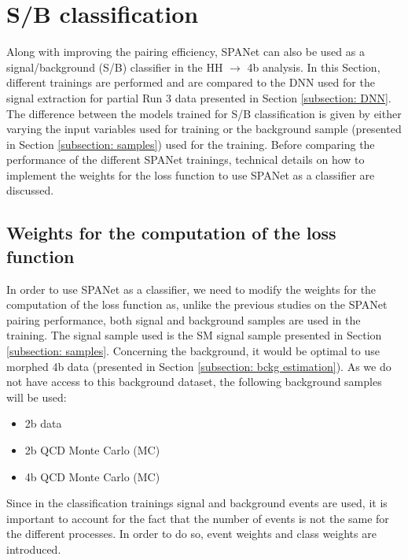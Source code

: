 \section{S/B classification} \label{section: s/b classification}


Along with improving the pairing efficiency, SPANet can also be used as a signal/background (S/B) classifier in the HH $\to$ 4b analysis. In this Section, different trainings are performed and are compared to the DNN used for the signal extraction for partial Run 3 data presented in Section \ref{subsection: DNN}. The difference between the models trained for S/B classification is given by either varying the input variables used for training or the background sample (presented in Section \ref{subsection: samples}) used for the training. Before comparing the performance of the different SPANet trainings, technical details on how to implement the weights for the loss function to use SPANet as a classifier are discussed.


\subsection{Weights for the computation of the loss function} \label{subsection: weights for the loss}

In order to use SPANet as a classifier, we need to modify the weights for the computation of the loss function as, unlike the previous studies on the SPANet pairing performance, both signal and background samples are used in the training. The signal sample used is the SM signal sample presented in Section \ref{subsection: samples}.  Concerning the background, it would be optimal to use morphed 4b data (presented in Section \ref{subsection: bckg estimation}). As we do not have access to this background dataset, the following background samples will be used:
\begin{itemize}
	\item 2b data
	\item 2b QCD Monte Carlo (MC)
    \item 4b QCD Monte Carlo (MC)
\end{itemize}
Since in the classification trainings signal and background events are used, it is important to account for the fact that the number of events is not the same for the different processes. In order to do so, {event weights} and {class weights} are introduced. 

